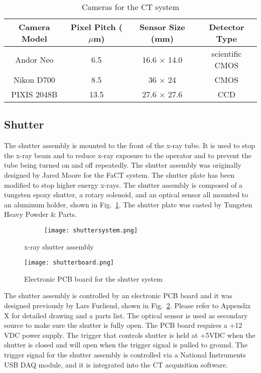 \begin{table}[h]
\begin{tabular}{c|c|c|c}
\hline
Camera Model & Pixel Pitch ($\mu$m) & Sensor Size (mm) & Detector Type \\ \hline
Andor Neo & 6.5 & 16.6 $\times$ 14.0 & scientific CMOS \\ \hline
Nikon D700 & 8.5 & 36 $\times$ 24 & CMOS \\ \hline
PIXIS 2048B & 13.5 & 27.6 $\times$ 27.6 & CCD \\
\hline
\end{tabular}
\caption{Cameras for the CT system}
\label{table:cameras}
\end{table}

\subsection{Shutter}
The shutter assembly is mounted to the front of the x-ray tube. It is used to stop the x-ray beam and to reduce x-ray exposure to the operator and to prevent the tube being turned on and off repeatedly.  The shutter assembly was originally designed by Jared Moore for the FaCT system.  The shutter plate has been modified to stop higher energy x-rays.  The shutter assembly is composed of a tungsten epoxy shutter, a rotary solenoid, and an optical sensor all mounted to an aluminum holder, shown in Fig.~\ref{fig:shutter}.  The shutter plate was casted by Tungsten Heavy Powder \& Parts.

\begin{figure}
\centering
	\begin{subfigure}{0.3\linewidth}
	\texttt{[image: shuttersystem.png]}
	\end{subfigure}
\hspace*{1cm}
	\begin{subfigure}{0.3\linewidth}
	\end{subfigure}	
\caption{x-ray shutter assembly}
\label{fig:shutter}
\end{figure}

\begin{figure}
\centering
\texttt{[image: shutterboard.png]}
\caption{Electronic PCB board for the shutter system}
\label{fig:shutterboard}
\end{figure}

The shutter assembly is controlled by an electronic PCB board and it was designed previously by Lars Furliend, shown in Fig.~\ref{fig:shutterboard}.  Please refer to Appendix X for detailed drawing and a parts list.  The optical sensor is used as secondary source to make sure the shutter is fully open.  The PCB board requires a +12 VDC power supply.  The trigger that controls shutter is held at +5VDC when the shutter is closed and will open when the trigger signal is pulled to ground.  The trigger signal for the shutter assembly is controlled via a National Instruments USB DAQ module, and it is integrated into the CT acquisition software.
		

